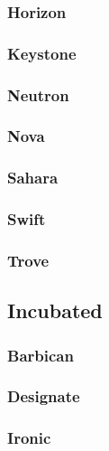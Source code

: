 \documentclass[a4wide,11pt]{report}
\begin{document}
\newpage 
\subsubsection{Horizon}


\newpage 
\subsubsection{Keystone}


\newpage 
\subsubsection{Neutron}


\newpage 
\subsubsection{Nova}


\newpage 
\subsubsection{Sahara}


\newpage 
\subsubsection{Swift}


\newpage 
\subsubsection{Trove}


\newpage
\subsection{Incubated}


\newpage 
\subsubsection{Barbican}


\newpage 
\subsubsection{Designate}


\newpage 
\subsubsection{Ironic}

\end{document}
